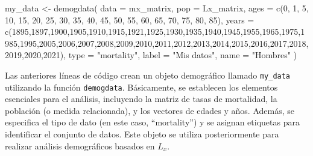 \documentclass[
]{article}
\newenvironment{Shaded}{\begin{snugshade}}{\end{snugshade}}
\newcommand{\AttributeTok}[1]{\textcolor[rgb]{0.77,0.63,0.00}{#1}}
\newcommand{\DecValTok}[1]{\textcolor[rgb]{0.00,0.00,0.81}{#1}}
\newcommand{\FunctionTok}[1]{\textcolor[rgb]{0.00,0.00,0.00}{#1}}
\newcommand{\NormalTok}[1]{#1}
\newcommand{\OtherTok}[1]{\textcolor[rgb]{0.56,0.35,0.01}{#1}}
\newcommand{\StringTok}[1]{\textcolor[rgb]{0.31,0.60,0.02}{#1}}
\begin{document}
\begin{Shaded}
\begin{Highlighting}[]
\NormalTok{my\_data }\OtherTok{\textless{}{-}} \FunctionTok{demogdata}\NormalTok{(}
  \AttributeTok{data =}\NormalTok{ mx\_matrix,           }
  \AttributeTok{pop =}\NormalTok{ Lx\_matrix,}
  \AttributeTok{ages =} \FunctionTok{c}\NormalTok{(}\DecValTok{0}\NormalTok{, }\DecValTok{1}\NormalTok{, }\DecValTok{5}\NormalTok{, }\DecValTok{10}\NormalTok{, }\DecValTok{15}\NormalTok{, }\DecValTok{20}\NormalTok{, }\DecValTok{25}\NormalTok{, }\DecValTok{30}\NormalTok{, }\DecValTok{35}\NormalTok{, }\DecValTok{40}\NormalTok{, }\DecValTok{45}\NormalTok{, }\DecValTok{50}\NormalTok{, }\DecValTok{55}\NormalTok{, }\DecValTok{60}\NormalTok{, }\DecValTok{65}\NormalTok{, }\DecValTok{70}\NormalTok{, }\DecValTok{75}\NormalTok{, }\DecValTok{80}\NormalTok{, }\DecValTok{85}\NormalTok{),        }
  \AttributeTok{years =} \FunctionTok{c}\NormalTok{(}\DecValTok{1895}\NormalTok{,}\DecValTok{1897}\NormalTok{,}\DecValTok{1900}\NormalTok{,}\DecValTok{1905}\NormalTok{,}\DecValTok{1910}\NormalTok{,}\DecValTok{1915}\NormalTok{,}\DecValTok{1921}\NormalTok{,}\DecValTok{1925}\NormalTok{,}\DecValTok{1930}\NormalTok{,}\DecValTok{1935}\NormalTok{,}\DecValTok{1940}\NormalTok{,}\DecValTok{1945}\NormalTok{,}\DecValTok{1955}\NormalTok{,}\DecValTok{1965}\NormalTok{,}\DecValTok{1975}\NormalTok{,}\DecValTok{1985}\NormalTok{,}\DecValTok{1995}\NormalTok{,}\DecValTok{2005}\NormalTok{,}\DecValTok{2006}\NormalTok{,}\DecValTok{2007}\NormalTok{,}\DecValTok{2008}\NormalTok{,}\DecValTok{2009}\NormalTok{,}\DecValTok{2010}\NormalTok{,}\DecValTok{2011}\NormalTok{,}\DecValTok{2012}\NormalTok{,}\DecValTok{2013}\NormalTok{,}\DecValTok{2014}\NormalTok{,}\DecValTok{2015}\NormalTok{,}\DecValTok{2016}\NormalTok{,}\DecValTok{2017}\NormalTok{,}\DecValTok{2018}\NormalTok{,}\DecValTok{2019}\NormalTok{,}\DecValTok{2020}\NormalTok{,}\DecValTok{2021}\NormalTok{),   }
  \AttributeTok{type =} \StringTok{"mortality"}\NormalTok{,  }
  \AttributeTok{label =} \StringTok{"Mis datos"}\NormalTok{,}
  \AttributeTok{name =} \StringTok{"Hombres"}
\NormalTok{)}
\end{Highlighting}
\end{Shaded}

Las anteriores líneas de código crean un objeto demográfico llamado
\texttt{my\_data} utilizando la función \texttt{demogdata}. Básicamente,
se establecen los elementos esenciales para el análisis, incluyendo la
matriz de tasas de mortalidad, la población (o medida relacionada), y
los vectores de edades y años. Además, se especifica el tipo de dato (en
este caso, ``mortality'') y se asignan etiquetas para identificar el
conjunto de datos. Este objeto se utiliza posteriormente para realizar
análisis demográficos basados en \(L_x\).
\end{document}

